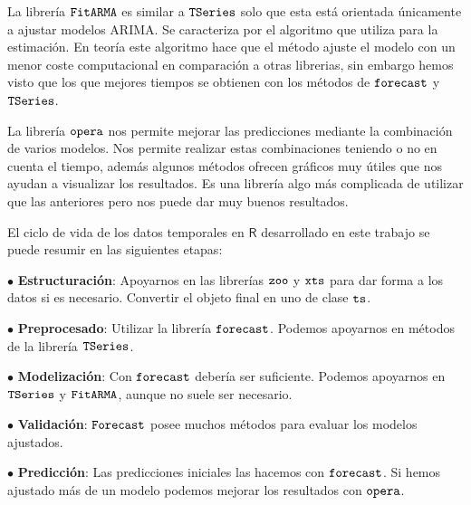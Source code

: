 La librería $\verb!FitARMA!$ es similar a $\verb!TSeries!$ solo que esta está orientada únicamente a ajustar modelos ARIMA. Se caracteriza por el algoritmo que utiliza para la estimación. En teoría este algoritmo hace que el método ajuste el modelo con un menor coste computacional en comparación a otras librerias, sin embargo hemos visto que los que mejores tiempos se obtienen con los métodos de $\verb!forecast!$ y  $\verb!TSeries!$.

La librería $\verb!opera!$ nos permite mejorar las predicciones mediante la combinación de varios modelos. Nos permite realizar estas combinaciones teniendo o no en  cuenta el tiempo, además algunos métodos ofrecen gráficos muy útiles que nos ayudan a visualizar los resultados. Es una librería algo más complicada de utilizar que las anteriores pero nos puede dar muy buenos resultados.

El ciclo de vida de los datos temporales en $\textsf{R}$ desarrollado en este trabajo se puede resumir en las siguientes etapas:

\begin{itemize*}
  \item[$\bullet$] \textbf{Estructuración}: Apoyarnos en las librerías $\verb!zoo!$ y $\verb!xts!$ para dar forma a los datos si es necesario. Convertir el objeto final en uno de clase $\verb!ts!$.
  \item[$\bullet$] \textbf{Preprocesado}: Utilizar la librería $\verb!forecast!$. Podemos apoyarnos en métodos de la librería $\verb!TSeries!$.
  \item[$\bullet$] \textbf{Modelización}: Con $\verb!forecast!$ debería ser suficiente. Podemos apoyarnos en $\verb!TSeries!$ y $\verb!FitARMA!$, aunque no suele ser necesario.
  \item[$\bullet$] \textbf{Validación}: $\verb!Forecast!$ posee muchos métodos para evaluar los modelos ajustados.
  \item[$\bullet$] \textbf{Predicción}: Las predicciones iniciales las hacemos con $\verb!forecast!$. Si hemos ajustado más de un modelo podemos mejorar los resultados con $\verb!opera!$.
\end{itemize*}





